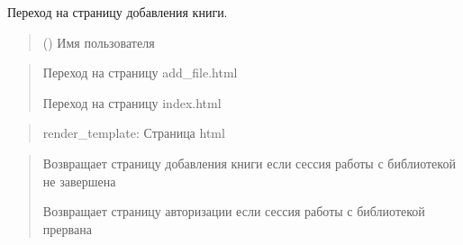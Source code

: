 \documentclass[letterpaper,10pt,russian]{sphinxmanual}
\begin{document}
\begin{fulllineitems}
\label{\detokenize{blueprints:blueprints.add_to_database.add}}
\pysigstartsignatures
{}
\pysigstopsignatures
\sphinxAtStartPar
Переход на страницу добавления книги.
\begin{quote}\begin{description}
\sphinxAtStartPar
{} () \textendash{} Имя пользователя

\end{description}\end{quote}
\begin{description}
\begin{quote}\begin{description}
\sphinxAtStartPar
Переход на страницу add\_file.html

\sphinxAtStartPar
Переход на страницу index.html

\end{description}\end{quote}

\end{description}
\begin{quote}\begin{description}
\sphinxAtStartPar
render\_template: Страница html

\end{description}\end{quote}
\begin{description}
\begin{quote}\begin{description}
\sphinxAtStartPar
Возвращает страницу добавления книги если сессия работы с библиотекой  не завершена

\sphinxAtStartPar
Возвращает страницу авторизации если сессия работы с библиотекой прервана

\end{description}\end{quote}

\end{description}

\end{fulllineitems}
\end{document}

